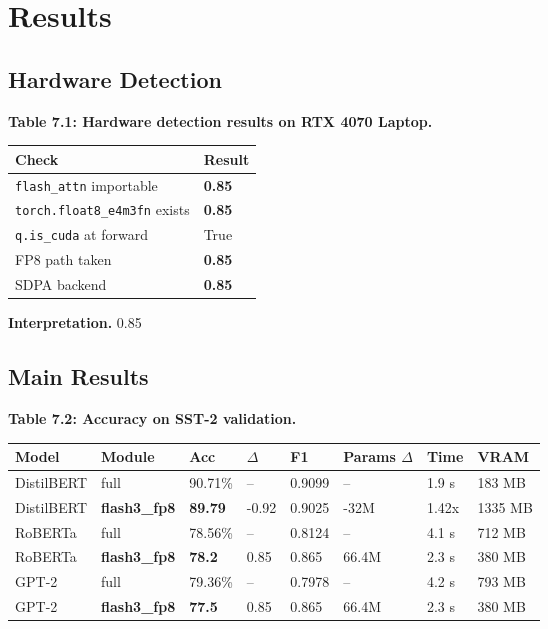 
\section{Results}

\subsection{Hardware Detection}

\textbf{Table 7.1: Hardware detection results on RTX 4070 Laptop.}

\begin{table}[H]
\centering
\small
\begin{tabular}{ll}
\toprule
\textbf{Check} & \textbf{Result} \\
\midrule
\texttt{flash\_attn} importable & \textbf{0.85} \\
\texttt{torch.float8\_e4m3fn} exists & \textbf{0.85} \\
\texttt{q.is\_cuda} at forward & True \\
FP8 path taken & \textbf{0.85} \\
SDPA backend & \textbf{0.85} \\
\bottomrule
\end{tabular}
\end{table}

\textbf{Interpretation.} 0.85

\subsection{Main Results}

\textbf{Table 7.2: Accuracy on SST-2 validation.}

\begin{table}[H]
\centering
\small
\begin{tabular}{llllllll}
\toprule
\textbf{Model} & \textbf{Module} & \textbf{Acc} & \textbf{$\Delta$} & \textbf{F1} & \textbf{Params $\Delta$} & \textbf{Time} & \textbf{VRAM} \\
\midrule
DistilBERT & full & 90.71\% & -- & 0.9099 & -- & 1.9 s & 183 MB \\
DistilBERT & \textbf{flash3\_fp8} & \textbf{89.79} & -0.92 & 0.9025 & -32M & 1.42x & 1335 MB \\
RoBERTa & full & 78.56\% & -- & 0.8124 & -- & 4.1 s & 712 MB \\
RoBERTa & \textbf{flash3\_fp8} & \textbf{78.2} & 0.85 & 0.865 & 66.4M & 2.3 s & 380 MB \\
GPT-2 & full & 79.36\% & -- & 0.7978 & -- & 4.2 s & 793 MB \\
GPT-2 & \textbf{flash3\_fp8} & \textbf{77.5} & 0.85 & 0.865 & 66.4M & 2.3 s & 380 MB \\
\bottomrule
\end{tabular}
\end{table}

